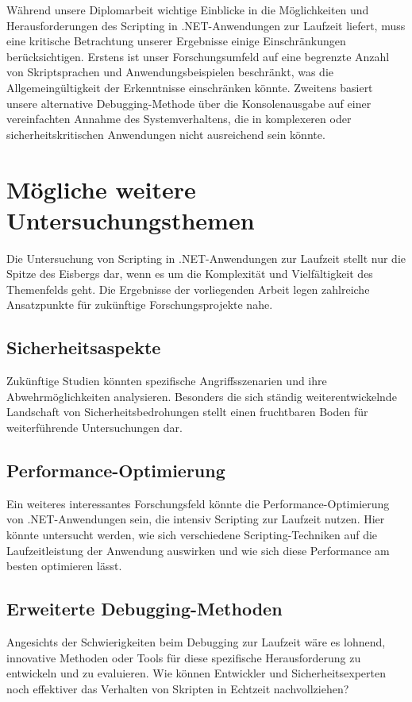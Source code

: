 Während unsere Diplomarbeit wichtige Einblicke in die Möglichkeiten und Herausforderungen 
des Scripting in .NET-Anwendungen zur Laufzeit liefert, muss eine kritische Betrachtung 
unserer Ergebnisse einige Einschränkungen berücksichtigen. Erstens ist unser Forschungsumfeld 
auf eine begrenzte Anzahl von Skriptsprachen und Anwendungsbeispielen beschränkt, 
was die Allgemeingültigkeit der Erkenntnisse einschränken könnte. Zweitens basiert 
unsere alternative Debugging-Methode über die Konsolenausgabe auf einer vereinfachten 
Annahme des Systemverhaltens, die in komplexeren oder sicherheitskritischen Anwendungen 
nicht ausreichend sein könnte. 

\newpage
\section{Mögliche weitere Untersuchungsthemen}

Die Untersuchung von Scripting in .NET-Anwendungen zur Laufzeit stellt nur die Spitze des 
Eisbergs dar, wenn es um die Komplexität und Vielfältigkeit des Themenfelds geht. 
Die Ergebnisse der vorliegenden Arbeit legen zahlreiche Ansatzpunkte für zukünftige 
Forschungsprojekte nahe.

\subsection*{Sicherheitsaspekte}

Zukünftige Studien könnten spezifische Angriffsszenarien und ihre Abwehrmöglichkeiten analysieren.
Besonders die sich ständig weiterentwickelnde Landschaft von Sicherheitsbedrohungen 
stellt einen fruchtbaren Boden für weiterführende Untersuchungen dar.

\subsection*{Performance-Optimierung}

Ein weiteres interessantes Forschungsfeld könnte die Performance-Optimierung von 
.NET-Anwendungen sein, die intensiv Scripting zur Laufzeit nutzen. Hier könnte 
untersucht werden, wie sich verschiedene Scripting-Techniken auf die Laufzeitleistung 
der Anwendung auswirken und wie sich diese Performance am besten optimieren lässt.

\subsection*{Erweiterte Debugging-Methoden}

Angesichts der Schwierigkeiten beim Debugging zur Laufzeit wäre es lohnend, 
innovative Methoden oder Tools für diese spezifische Herausforderung zu entwickeln 
und zu evaluieren. Wie können Entwickler und Sicherheitsexperten noch effektiver das 
Verhalten von Skripten in Echtzeit nachvollziehen?